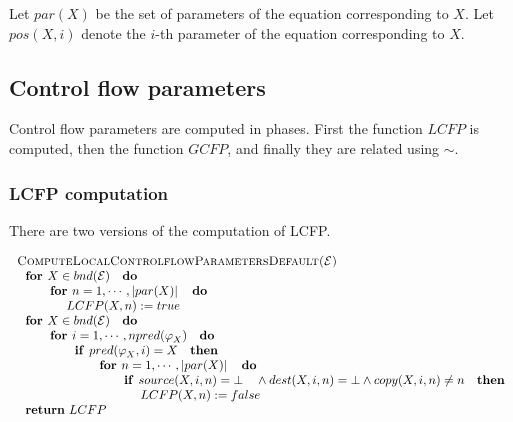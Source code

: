 Let $par(X)$ be the set of parameters of the equation corresponding to $X$.
Let $pos(X,i)$ denote the $i$-th parameter of the equation corresponding to $%
X$.\newpage

\subsection{Control flow parameters}

Control flow parameters are computed in phases. First the function $LCFP$ is
computed, then the function $GCFP$, and finally they are related using $\sim 
$.

\subsubsection{LCFP computation}

There are two versions of the computation of LCFP.

\begin{equation*}
\begin{tabular}{l}
\textsc{ComputeLocalControlflowParametersDefault(}$\mathcal{E}$\textsc{)} \\ 
$\text{\textbf{for }}X\in bnd(\mathcal{E})\text{ \textbf{do}}$ \\ 
$\qquad \text{\textbf{for }}n=1,\cdots ,\left\vert par(X)\right\vert \text{ 
\textbf{do}}$ \\ 
$\qquad \qquad LCFP(X,n):=true$ \\ 
$\text{\textbf{for }}X\in bnd(\mathcal{E})\text{ \textbf{do}}$ \\ 
$\qquad \text{\textbf{for }}i=1,\cdots ,npred(\varphi _{X})\text{ \textbf{do}%
}$ \\ 
$\qquad \qquad \text{\textbf{if }}pred(\varphi _{X},i)=X\text{ \textbf{then}}
$ \\ 
$\qquad \qquad \qquad \text{\textbf{for }}n=1,\cdots ,\left\vert
par(X)\right\vert \text{ \textbf{do}}$ \\ 
$\qquad \qquad \qquad \qquad \text{\textbf{if }}source(X,i,n)=\bot \text{ }%
\wedge dest(X,i,n)=\bot \wedge copy(X,i,n)\neq n\text{ \textbf{then}}$ \\ 
$\qquad \qquad \qquad \qquad \qquad LCFP(X,n):=false$ \\ 
$\text{\textbf{return} }LCFP$%
\end{tabular}%
\end{equation*}

